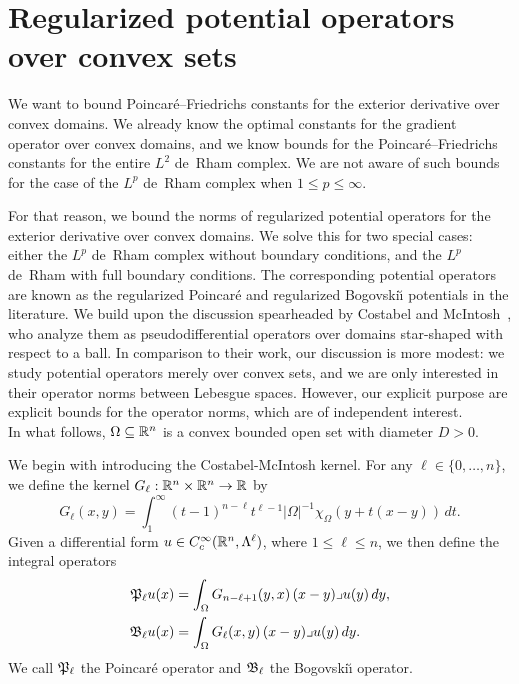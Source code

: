 \documentclass[10pt,letterpaper]{article}
\begin{document}
\section{Regularized potential operators over convex sets}\label{section:potentialoperator}

We want to bound Poincar\'e--Friedrichs constants for the exterior derivative over convex domains.
We already know the optimal constants for the gradient operator over convex domains,
and we know bounds for the Poincar\'e--Friedrichs constants for the entire $L^{2}$ de~Rham complex. 
We are not aware of such bounds for the case of the $L^{p}$ de~Rham complex when $1 \leq p \leq \infty$. 

For that reason, we bound the norms of regularized potential operators for the exterior derivative over convex domains.
We solve this for two special cases: either the $L^{p}$ de~Rham complex without boundary conditions, 
and the $L^{p}$ de~Rham with full boundary conditions. 
The corresponding potential operators are known as the regularized Poincar\'e and regularized Bogovski\u{\i} potentials in the literature. 
We build upon the discussion spearheaded by Costabel and McIntosh~\cite{costabel2010bogovskiui},
who analyze them as pseudodifferential operators over domains star-shaped with respect to a ball. 
% 
In comparison to their work, our discussion is more modest:
we study potential operators merely over convex sets, and we are only interested in their operator norms between Lebesgue spaces.
However, our explicit purpose are explicit bounds for the operator norms, which are of independent interest. 
\\

In what follows, $\Omega \subseteq {\mathbb R}^{n}$ is a convex bounded open set with diameter $D > 0$.

We begin with introducing the Costabel-McIntosh kernel.
For any $\ell \in \{0,\dotsc,n\}$, we define the kernel $G_{\ell} : {\mathbb R}^{n} \times {\mathbb R}^{n} \rightarrow {\mathbb R}$ by
\begin{equation}\label{math:mainkernel}
  G_{\ell}(x,y) = \int_{1}^\infty (t-1)^{n-\ell}t^{\ell-1} |\Omega|^{-1}\chi_{\Omega} \left(y+t(x-y)\right)\,dt
  .
\end{equation}
Given a differential form $u \in {C^\infty_c}({\mathbb R}^n,\Lambda^\ell)$, where \(1 \leq \ell \leq n\), 
we then define the integral operators
\begin{align*}
  {\mathfrak P}_{\ell} u(x) &= \int_{\Omega} G_{n-\ell+1}(y,x) \,(x-y)\lrcorner u(y)\,dy,
  \\
  {\mathfrak B}_{\ell} u(x) &= \int_{\Omega} G_{\ell}(x,y) \,(x-y)\lrcorner u(y)\,dy.
\end{align*}
We call ${\mathfrak P}_{\ell}$ the Poincar\'e operator and ${\mathfrak B}_{\ell}$ the Bogovski\u{\i} operator. 
\\
\end{document}
